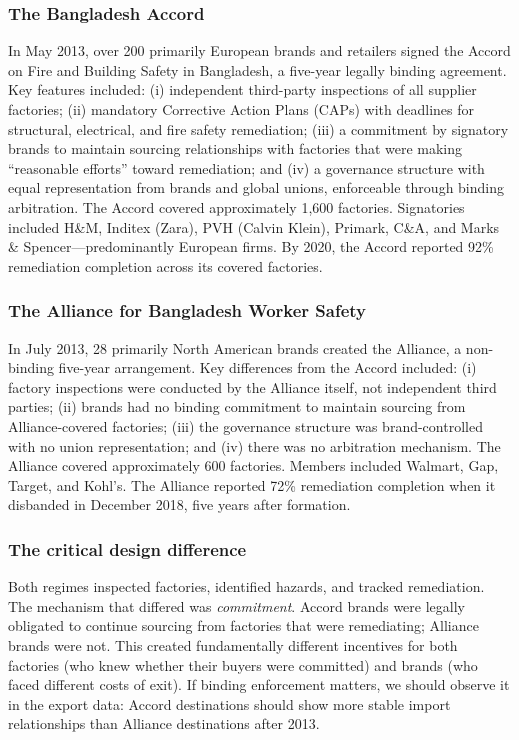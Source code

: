 \documentclass[12pt]{article}
\begin{document}
\subsubsection*{The Bangladesh Accord} In May 2013, over 200 primarily European brands and retailers signed the Accord on Fire and Building Safety in Bangladesh, a five-year legally binding agreement. Key features included: (i) independent third-party inspections of all supplier factories; (ii) mandatory Corrective Action Plans (CAPs) with deadlines for structural, electrical, and fire safety remediation; (iii) a commitment by signatory brands to maintain sourcing relationships with factories that were making ``reasonable efforts'' toward remediation; and (iv) a governance structure with equal representation from brands and global unions, enforceable through binding arbitration. The Accord covered approximately 1,600 factories. Signatories included H\&M, Inditex (Zara), PVH (Calvin Klein), Primark, C\&A, and Marks \& Spencer---predominantly European firms. By 2020, the Accord reported 92\% remediation completion across its covered factories.

\subsubsection*{The Alliance for Bangladesh Worker Safety} In July 2013, 28 primarily North American brands created the Alliance, a non-binding five-year arrangement. Key differences from the Accord included: (i) factory inspections were conducted by the Alliance itself, not independent third parties; (ii) brands had no binding commitment to maintain sourcing from Alliance-covered factories; (iii) the governance structure was brand-controlled with no union representation; and (iv) there was no arbitration mechanism. The Alliance covered approximately 600 factories. Members included Walmart, Gap, Target, and Kohl's. The Alliance reported 72\% remediation completion when it disbanded in December 2018, five years after formation.

\subsubsection*{The critical design difference} Both regimes inspected factories, identified hazards, and tracked remediation. The mechanism that differed was \textit{commitment}. Accord brands were legally obligated to continue sourcing from factories that were remediating; Alliance brands were not. This created fundamentally different incentives for both factories (who knew whether their buyers were committed) and brands (who faced different costs of exit). If binding enforcement matters, we should observe it in the export data: Accord destinations should show more stable import relationships than Alliance destinations after 2013.
\end{document}
